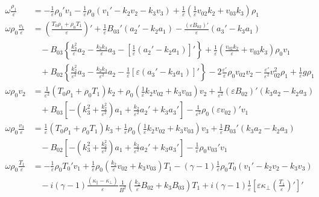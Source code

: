 \documentclass[11pt, fleqn]{article}
\newcommand{\eps}{\varepsilon}
\begin{document}
\begin{align*}
	\omega \frac{\rho_1}{\eps}		&= -\frac{1}{\eps}\rho_0'v_1 - \frac{1}{\eps}\rho_0\left(v_1' - k_2v_2 - k_3v_3\right) + \frac{1}{\eps}\left(\frac{1}{\eps}v_{02}k_2 + v_{03}k_3\right)\rho_1						\\[8pt]
	\omega \rho_0 \frac{v_1}{\eps}	&= \left(\frac{T_0\rho_1 + \rho_0 T_1}{\eps}\right)' + \frac{1}{\eps}B_{03}'\left(a_2' - k_2a_1\right) - \frac{(\eps B_{02})'}{\eps}\left(a_3' - k_3a_1\right)						\\
									&~~~~ 	- B_{03}\left\{\frac{k_3^2}{\eps}a_2 - \frac{k_2k_3}{\eps}a_3 - \left[\frac{1}{\eps}\left(a_2' - k_2a_1\right)\right]'\right\} 
											+ \frac{1}{\eps}\left(\frac{v_{02}k_2}{\eps}+v_{03}k_3\right)\rho_0v_1																										\\
									&~~~~ 	+ B_{02}\left\{\frac{k_2^2}{\eps^2}a_3 - \frac{k_2k_3}{\eps^2}a_2 - \frac{1}{\eps}\left[\eps\left(a_3' - k_3a_1\right)\right]'\right\} 
											- 2\frac{\eps'}{\eps}\rho_0v_{02}v_2 - \frac{\eps'}{\eps^2}v_{02}^2\rho_1  + \frac{1}{\eps}g\rho_1																		 	\\[8pt]
	\omega \rho_0 v_2				&= \frac{1}{\eps^2}(T_0\rho_1 + \rho_0T_1)k_2 + \rho_0\left(\frac{1}{\eps}k_2v_{02} + k_3v_{03}\right)v_2 + \frac{1}{\eps^2}(\eps B_{02})'\left(k_3a_2 - k_2a_3\right)				\\
									&~~~~ 	+ B_{03}\left[-\left(k_3^2 + \frac{k_2^2}{\eps^2}\right)a_1 + \frac{k_2}{\eps^2}a_2' + k_3a_3'\right] - \frac{1}{\eps^2}\rho_0(\eps v_{02})'v_1								\\[8pt]
	\omega \rho_0 \frac{v_3}{\eps} 	&= \frac{1}{\eps}(T_0 \rho_1 + \rho_0 T_1)k_3 + \frac{1}{\eps}\rho_0\left(\frac{1}{\eps}k_2v_{02} + k_3v_{03}\right)v_3 + \frac{1}{\eps}B_{03}'\left(k_3a_2 - k_2a_3\right)			\\
									&~~~~ 	- B_{02}\left[-\left(k_3^2 + \frac{k_2^2}{\eps^2}\right)a_1 + \frac{k_2}{\eps^2}a_2' + k_3a_3'\right] - \frac{1}{\eps}\rho_0v_{03}'v_1										\\[8pt]
	\omega \rho_0 \frac{T_1}{\eps}	&= -\frac{1}{\eps}\rho_0T_0'v_1 + \frac{1}{\eps}\rho_0\left(\frac{k_2}{\eps}v_{02} + k_3v_{03}\right)T_1 - (\gamma - 1)\frac{1}{\eps}\rho_0T_0\left(v_1' - k_2v_2 - k_3v_3\right) 	\\
									&~~~~ 	- i(\gamma - 1)\frac{(\kappa_\parallel - \kappa_\bot)}{\eps}\frac{1}{B^2}\left(\frac{k_2}{\eps}B_{02} + k_3B_{03}\right)T_1 
											+ i(\gamma -1)\frac{1}{\eps}\left[\eps\kappa_\bot\left(\frac{T_1}{\eps}\right)'\right]'																						\\

\end{align*}
\end{document}
